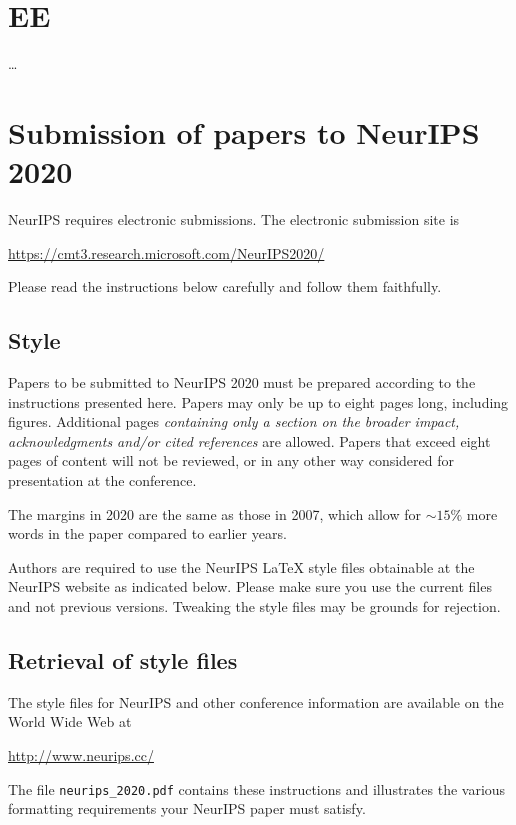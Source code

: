 \documentclass{article}
\begin{document}
\section{EE} \label{section:nograph}
\dots

\pagebreak
\nocite{*}



\pagebreak
\section{Submission of papers to NeurIPS 2020}

NeurIPS requires electronic submissions.  The electronic submission site is
\begin{center}
    \url{https://cmt3.research.microsoft.com/NeurIPS2020/}
\end{center}

Please read the instructions below carefully and follow them faithfully.

\subsection{Style}

Papers to be submitted to NeurIPS 2020 must be prepared according to the
instructions presented here. Papers may only be up to eight pages long,
including figures. Additional pages \emph{containing only a section on the broader impact, acknowledgments and/or cited references} are allowed. Papers that exceed eight pages of content will not be reviewed, or in any other way considered for
presentation at the conference.

The margins in 2020 are the same as those in 2007, which allow for $\sim$$15\%$
more words in the paper compared to earlier years.

Authors are required to use the NeurIPS \LaTeX{} style files obtainable at the
NeurIPS website as indicated below. Please make sure you use the current files
and not previous versions. Tweaking the style files may be grounds for
rejection.

\subsection{Retrieval of style files}

The style files for NeurIPS and other conference information are available on
the World Wide Web at
\begin{center}
    \url{http://www.neurips.cc/}
\end{center}
The file \verb+neurips_2020.pdf+ contains these instructions and illustrates the
various formatting requirements your NeurIPS paper must satisfy.
\end{document}
